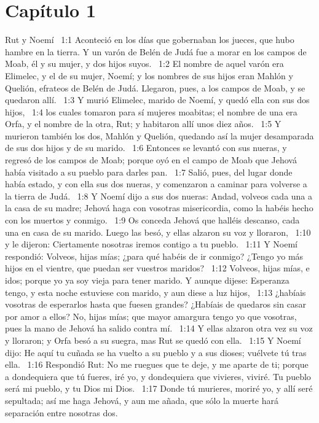 \section*{Capítulo 1}

Rut y Noemí  
1:1 Aconteció en los días que gobernaban los jueces, que hubo hambre en la tierra. Y un varón de Belén de Judá fue a morar en los campos de Moab, él y su mujer, y dos hijos suyos.  
1:2 El nombre de aquel varón era Elimelec, y el de su mujer, Noemí; y los nombres de sus hijos eran Mahlón y Quelión, efrateos de Belén de Judá. Llegaron, pues, a los campos de Moab, y se quedaron allí.  
1:3 Y murió Elimelec, marido de Noemí, y quedó ella con sus dos hijos,  
1:4 los cuales tomaron para sí mujeres moabitas; el nombre de una era Orfa, y el nombre de la otra, Rut; y habitaron allí unos diez años.  
1:5 Y murieron también los dos, Mahlón y Quelión, quedando así la mujer desamparada de sus dos hijos y de su marido.  
1:6 Entonces se levantó con sus nueras, y regresó de los campos de Moab; porque oyó en el campo de Moab que Jehová había visitado a su pueblo para darles pan.  
1:7 Salió, pues, del lugar donde había estado, y con ella sus dos nueras, y comenzaron a caminar para volverse a la tierra de Judá.  
1:8 Y Noemí dijo a sus dos nueras: Andad, volveos cada una a la casa de su madre; Jehová haga con vosotras misericordia, como la habéis hecho con los muertos y conmigo.  
1:9 Os conceda Jehová que halléis descanso, cada una en casa de su marido. Luego las besó, y ellas alzaron su voz y lloraron,  
1:10 y le dijeron: Ciertamente nosotras iremos contigo a tu pueblo.  
1:11 Y Noemí respondió: Volveos, hijas mías; ¿para qué habéis de ir conmigo? ¿Tengo yo más hijos en el vientre, que puedan ser vuestros maridos?  
1:12 Volveos, hijas mías, e idos; porque yo ya soy vieja para tener marido. Y aunque dijese: Esperanza tengo, y esta noche estuviese con marido, y aun diese a luz hijos,  
1:13 ¿habíais vosotras de esperarlos hasta que fuesen grandes? ¿Habíais de quedaros sin casar por amor a ellos? No, hijas mías; que mayor amargura tengo yo que vosotras, pues la mano de Jehová ha salido contra mí.  
1:14 Y ellas alzaron otra vez su voz y lloraron; y Orfa besó a su suegra, mas Rut se quedó con ella.  
1:15 Y Noemí dijo: He aquí tu cuñada se ha vuelto a su pueblo y a sus dioses; vuélvete tú tras ella.  
1:16 Respondió Rut: No me ruegues que te deje, y me aparte de ti; porque a dondequiera que tú fueres, iré yo, y dondequiera que vivieres, viviré. Tu pueblo será mi pueblo, y tu Dios mi Dios.  
1:17 Donde tú murieres, moriré yo, y allí seré sepultada; así me haga Jehová, y aun me añada, que sólo la muerte hará separación entre nosotras dos. 
